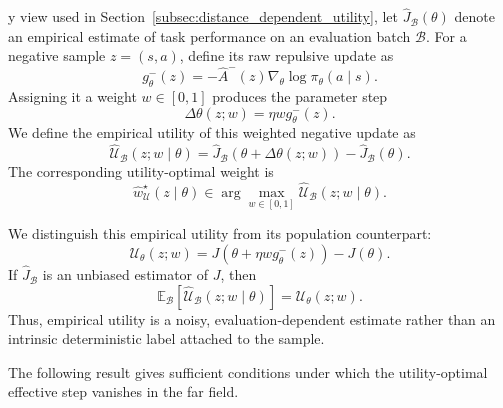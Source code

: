 y view used in
Section~\ref{subsec:distance_dependent_utility}, let
\(\widehat J_{\mathcal B}(\theta)\) denote an empirical estimate of task
performance on an evaluation batch \(\mathcal B\). For a negative sample
\(z=(s,a)\), define its raw repulsive update as
\begin{equation}
    g_\theta^-(z)
    =
    -\widehat A^-(z)
    \nabla_\theta \log \pi_\theta(a\mid s).
    \label{eq:raw_negative_update}
\end{equation}
Assigning it a weight \(w\in[0,1]\) produces the parameter step
\begin{equation}
    \Delta\theta(z;w)
    =
    \eta w g_\theta^-(z).
    \label{eq:weighted_negative_step}
\end{equation}
We define the empirical utility of this weighted negative update as
\begin{equation}
    \widehat{\mathcal U}_{\mathcal B}
    (z;w\mid\theta)
    =
    \widehat J_{\mathcal B}
    \!\left(
        \theta+\Delta\theta(z;w)
    \right)
    -
    \widehat J_{\mathcal B}(\theta).
    \label{eq:app_empirical_negative_update_utility}
\end{equation}
The corresponding utility-optimal weight is
\begin{equation}
    \widehat w_{\mathcal U}^{\star}(z\mid\theta)
    \in
    \arg\max_{w\in[0,1]}
    \widehat{\mathcal U}_{\mathcal B}(z;w\mid\theta).
    \label{eq:empirical_utility_optimal_weight}
\end{equation}

We distinguish this empirical utility from its population counterpart:
\begin{equation}
    \mathcal U_\theta(z;w)
    =
    J\!\left(
        \theta+\eta w g_\theta^-(z)
    \right)
    -
    J(\theta).
    \label{eq:population_negative_update_utility}
\end{equation}
If \(\widehat J_{\mathcal B}\) is an unbiased estimator of \(J\), then
\begin{equation}
    \mathbb E_{\mathcal B}
    \left[
        \widehat{\mathcal U}_{\mathcal B}(z;w\mid\theta)
    \right]
    =
    \mathcal U_\theta(z;w).
    \label{eq:empirical_utility_unbiased}
\end{equation}
Thus, empirical utility is a noisy, evaluation-dependent estimate rather
than an intrinsic deterministic label attached to the sample.

The following result gives sufficient conditions under which the
utility-optimal effective step vanishes in the far field.


